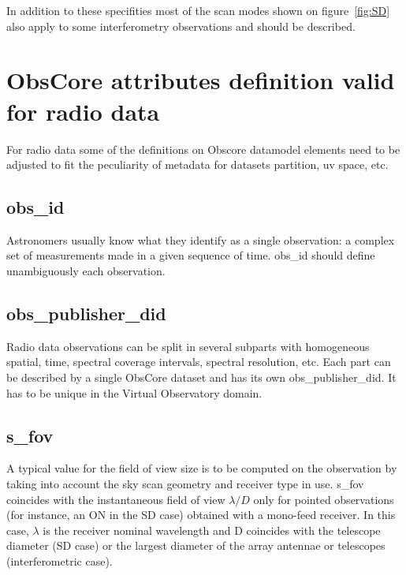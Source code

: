 \documentclass[11pt,a4paper]{ivoa}
\begin{document}
In addition to these specifities most of the scan modes shown on figure~\ref{fig:SD} also 
apply to some interferometry observations and should be described. 

\section{ObsCore attributes definition valid for radio data}
\label{sec:ObsCoreRadDef}

For radio data some of the definitions on Obscore datamodel elements need to be adjusted 
to fit the peculiarity of metadata for datasets partition, uv space, etc.

\subsection{obs\_id}

Astronomers usually know what they identify as a single observation: a complex set of 
measurements made in a given sequence of time. obs\_id should define unambiguously each 
observation.

\subsection{obs\_publisher\_did}

Radio data observations can be split in several subparts with homogeneous spatial, 
time, spectral coverage intervals, spectral resolution, etc. Each part can be described by 
a single ObsCore dataset and has its own obs\_publisher\_did. It has to be unique in the 
Virtual Observatory domain.

\subsection{s\_fov}
\label{sec:fov}

A typical value for the field of view size is to be computed on the observation by taking into account the sky scan geometry and receiver type in use.
s\_fov coincides with the instantaneous field of view $\lambda / D$ only for pointed observations (for instance, an ON in the SD case) obtained with a mono-feed receiver. In this case, $\lambda$ is the
receiver nominal wavelength and D coincides with the telescope diameter (SD case) or the largest diameter of the array antennae or telescopes (interferometric case). 
\end{document}
